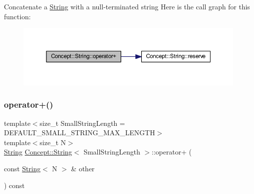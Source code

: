 Concatenate a \mbox{\hyperlink{class_concept_1_1_string}{String}} with a null-\/terminated string Here is the call graph for this function\+:\nopagebreak
\begin{figure}[H]
\begin{center}
\leavevmode
\includegraphics[width=350pt]{class_concept_1_1_string_ae6e294670372f2eeaa224d88f5f1a178_cgraph}
\end{center}
\end{figure}
\mbox{\label{class_concept_1_1_string_ab38b1349fc69cb86c1c524a161f5703f}} 
\subsubsection{\texorpdfstring{operator+()}{operator+()}\hspace{0.1cm}{\footnotesize\ttfamily [2/2]}}
{\footnotesize\ttfamily template$<$size\+\_\+t Small\+String\+Length = D\+E\+F\+A\+U\+L\+T\+\_\+\+S\+M\+A\+L\+L\+\_\+\+S\+T\+R\+I\+N\+G\+\_\+\+M\+A\+X\+\_\+\+L\+E\+N\+G\+TH$>$ \\
template$<$size\+\_\+t N$>$ \\
\mbox{\hyperlink{class_concept_1_1_string}{String}} \mbox{\hyperlink{class_concept_1_1_string}{Concept\+::\+String}}$<$ Small\+String\+Length $>$\+::operator+ (\begin{DoxyParamCaption}\item[{const \mbox{\hyperlink{class_concept_1_1_string}{String}}$<$ N $>$ \&}]{other }\end{DoxyParamCaption}) const\hspace{0.3cm}{\ttfamily [inline]}}

